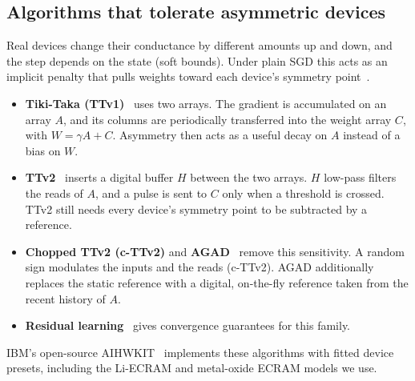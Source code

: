 \subsection{Algorithms that tolerate asymmetric devices}
Real devices change their conductance by different amounts up and down, and the step depends on the state (soft bounds). Under
plain SGD this acts as an implicit penalty that pulls weights toward each device's symmetry point~\cite{gokmen2020,wu2025}.
\begin{itemize}
\item \textbf{Tiki-Taka (TTv1)}~\cite{gokmen2020} uses two arrays. The gradient is accumulated on an array $A$, and its columns
      are periodically transferred into the weight array $C$, with $W=\gamma A+C$. Asymmetry then acts as a useful decay on $A$
      instead of a bias on $W$.
\item \textbf{TTv2}~\cite{gokmen2021} inserts a digital buffer $H$ between the two arrays. $H$ low-pass filters the reads of $A$,
      and a pulse is sent to $C$ only when a threshold is crossed. TTv2 still needs every device's symmetry point to be
      subtracted by a reference.
\item \textbf{Chopped TTv2 (c-TTv2)} and \textbf{AGAD}~\cite{rasch2024,rasch2023arxiv} remove this sensitivity. A random sign
      modulates the inputs and the reads (c-TTv2). AGAD additionally replaces the static reference with a digital, on-the-fly
      reference taken from the recent history of $A$.
\item \textbf{Residual learning}~\cite{wu2025} gives convergence guarantees for this family.
\end{itemize}
IBM's open-source AIHWKIT~\cite{rasch2021aihwkit} implements these algorithms with fitted device presets, including the
Li-ECRAM and metal-oxide ECRAM models we use.

